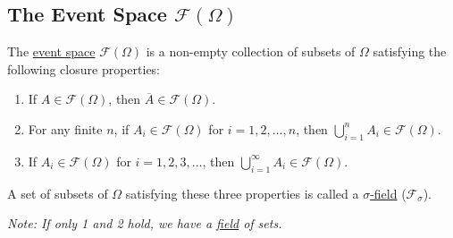 \documentclass[12pt,thmsa]{article}
\begin{document}
\subsection{The Event Space \( \mathcal{F}(\Omega) \)} %
The \underline{event space} \( \mathcal{F}(\Omega) \) is a non-empty collection of subsets of \(\Omega\) satisfying the following closure properties:

\begin{enumerate}
	\item If \( A \in \mathcal{F}(\Omega) \), then \( \overline{A} \in \mathcal{F}(\Omega) \).
	\item For any finite \( n \), if \( A_i \in \mathcal{F}(\Omega) \) for \( i = 1, 2, \ldots, n \), then \( \bigcup_{i=1}^{n} A_i \in \mathcal{F}(\Omega) \).
	\item If \( A_i \in \mathcal{F}(\Omega) \) for \( i = 1, 2, 3, \ldots \), then \( \bigcup_{i=1}^{\infty} A_i \in \mathcal{F}(\Omega) \).
\end{enumerate}

A set of subsets of \(\Omega\) satisfying these three properties is called a \underline{\( \sigma \)-field} (\(\mathcal{F}_{\sigma}\)). 

\textit{Note: If only 1 and 2 hold, we have a \underline{field} of sets.}

\end{document}

